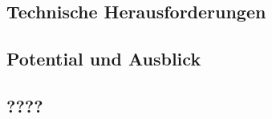 \lipsum[2]

\subsection{Technische Herausforderungen}\label{sec:VRHerausforderungen}
\lipsum[2]

\subsection{Potential und Ausblick}\label{sec:VRPotentialUndAusblick}

\lipsum[2]

\subsection{????}\label{sec:????}

\lipsum[2]

